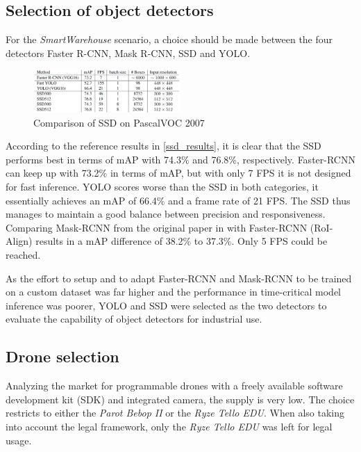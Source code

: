 \documentclass[a4paper, 10pt, journal]{wissarbIEEE}      %
\begin{document}
\subsection{Selection of object detectors}

For the \textit{SmartWarehouse} scenario, a choice should be made between the four detectors Faster R-CNN, Mask R-CNN, SSD and YOLO. 

\begin{figure}[h]
	\centering
	\includegraphics[width=0.5\textwidth]{fig/ssd_results.png}
	\caption{Comparison of SSD on PascalVOC 2007 \cite{WeiLiuDragomirAnguelovDumitruErhanChristianSzegedyScottReedChengYangFuAlexander.2016}}
	\label{ssd_results}
\end{figure}

According to the reference results in \autoref{ssd_results}, it is clear that the SSD performs best in terms of mAP with 74.3\% and 76.8\%, respectively. Faster-RCNN can keep up with 73.2\% in terms of mAP, but with only 7 FPS it is not designed for fast inference. YOLO scores worse than the SSD in both categories, it essentially achieves an mAP of 66.4\% and a frame rate of 21 FPS. The SSD thus manages to maintain a good balance between precision and responsiveness. Comparing Mask-RCNN from the original paper in \cite{KaimingHeGeorgiaGkioxariPiotrDollarRossGirshick.2018} with Faster-RCNN (RoI-Align) results in a mAP difference of 38.2\% to 37.3\%. Only 5 FPS could be reached. 

As the effort to setup and to adapt Faster-RCNN and Mask-RCNN to be trained on a custom dataset was far higher and the performance in time-critical model inference was poorer, YOLO and SSD were selected as the two detectors to evaluate the capability of object detectors for industrial use.

\subsection{Drone selection}

Analyzing the market for programmable drones with a freely available software development kit (SDK) and integrated camera, the supply is very low. The choice restricts to either the \textit{Parot Bebop II} or the \textit{Ryze Tello EDU}. When also taking into account the legal framework, only the \textit{Ryze Tello EDU} was left for legal usage.
\end{document}

